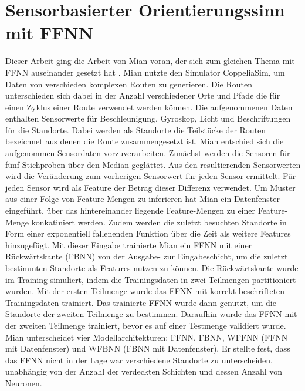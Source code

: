 \section{Sensorbasierter Orientierungssinn mit FFNN}
Dieser Arbeit ging die Arbeit von Mian voran, der sich zum gleichen Thema mit FFNN auseinander gesetzt hat \cite{naveedThesis}.
Mian nutzte den Simulator CoppeliaSim, um Daten von verschieden komplexen Routen zu generieren.
Die Routen unterschieden sich dabei in der Anzahl verschiedener Orte und Pfade die für einen Zyklus einer Route verwendet werden können.
Die aufgenommenen Daten enthalten Sensorwerte für Beschleunigung, Gyroskop, Licht und Beschriftungen für die Standorte.
Dabei werden als Standorte die Teilstücke der Routen bezeichnet aus denen die Route zusammengesetzt ist.
\newline
\newline
Mian entschied sich die aufgenommen Sensordaten vorzuverarbeiten.
Zunächst werden die Sensoren für fünf Stichproben über den Median geglättet.
Aus den resultierenden Sensorwerten wird die Veränderung zum vorherigen Sensorwert für jeden Sensor ermittelt.
Für jeden Sensor wird als Feature der Betrag dieser Differenz verwendet.
Um Muster aus einer Folge von Feature-Mengen zu inferieren hat Mian ein Datenfenster eingeführt, über das
hintereinander liegende Feature-Mengen zu einer Feature-Menge konkatiniert werden.
Zudem werden die zuletzt besuchten Standorte in Form einer exponentiell fallenenden Funktion über die Zeit als weitere Features hinzugefügt.
\newpage
Mit dieser Eingabe trainierte Mian ein FFNN mit einer Rückwärtskante (FBNN) von der Ausgabe- zur Eingabeschicht,
um die zuletzt bestimmten Standorte als Features nutzen zu können.
Die Rückwärtskante wurde im Training simuliert, indem die Trainingsdaten in zwei Teilmengen partitioniert wurden.
Mit der ersten Teilmenge wurde das FFNN mit korrekt beschrifteten Trainingsdaten trainiert.
Das trainierte FFNN wurde dann genutzt, um die Standorte der zweiten Teilmenge zu bestimmen.
Daraufhin wurde das FFNN mit der zweiten Teilmenge trainiert, bevor es auf einer Testmenge validiert wurde.
\newline
\newline
Mian unterscheidet vier Modellarchitekturen: FFNN, FBNN, WFFNN (FFNN mit Datenfenster) und WFBNN (FBNN mit Datenfenster).
Er stellte fest, dass das FFNN nicht in der Lage war verschiedene Standorte zu unterscheiden,
unabhängig von der Anzahl der verdeckten Schichten und dessen Anzahl von Neuronen.
\newline
\newline
